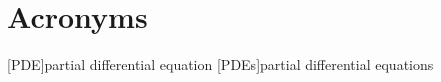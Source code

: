 \chapter*{Acronyms}

\begin{acronym}[TDMA]
    [PDE]{partial differential equation}
    [PDEs]{partial differential equations}
\end{acronym}

\vfill